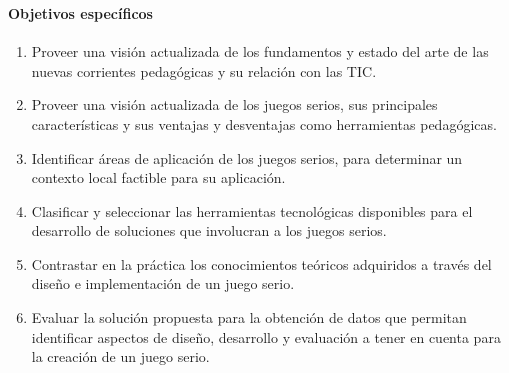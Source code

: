\begin{frame}
\frametitle{\pagetitle}
\framesubtitle{Objetivos específicos}

\small
\begin{enumerate}[<+->]

\item Proveer una visión actualizada de los fundamentos y estado del arte de las
    nuevas corrientes pedagógicas y su relación con las TIC.

\item Proveer una visión actualizada de los juegos serios, sus principales
    características y sus ventajas y desventajas como herramientas pedagógicas.

\item Identificar áreas de aplicación de los juegos serios, para determinar un
    contexto local factible para su aplicación.

\item Clasificar y seleccionar las herramientas tecnológicas disponibles para el
    desarrollo de soluciones que involucran a los juegos serios.

\item Contrastar en la práctica los conocimientos teóricos adquiridos a través
    del diseño e implementación de un juego serio.

\item Evaluar la solución propuesta para la obtención de datos que permitan
    identificar aspectos de diseño, desarrollo y evaluación a tener en cuenta
    para la creación de un juego serio.

\end{enumerate}

\end{frame}


